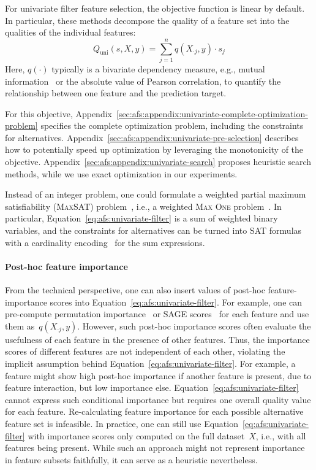 \documentclass{article}
\theoremstyle{definition}
\begin{document}
For univariate filter feature selection, the objective function is linear by default.
In particular, these methods decompose the quality of a feature set into the qualities of the individual features:
%
\begin{equation}
	Q_{\text{uni}}(s,X,y) = \sum_{j=1}^{n} q(X_{\cdot{}j},y) \cdot s_j
	\label{eq:afs:univariate-filter}
\end{equation}
%
Here, $q(\cdot)$ typically is a bivariate dependency measure, e.g., mutual information~\cite{kraskov2004estimating} or the absolute value of Pearson correlation, to quantify the relationship between one feature and the prediction target.

For this objective, Appendix~\ref{sec:afs:appendix:univariate-complete-optimization-problem} specifies the complete optimization problem, including the constraints for alternatives.
Appendix~\ref{sec:afs:appendix:univariate-pre-selection} describes how to potentially speed up optimization by leveraging the monotonicity of the objective.
Appendix~\ref{sec:afs:appendix:univariate-search} proposes heuristic search methods, while we use exact optimization in our experiments.

Instead of an integer problem, one could formulate a weighted partial maximum satisfiability (\textsc{MaxSAT}) problem~\cite{bacchus2021maximum, li2021maxsat}, i.e., a weighted \textsc{Max One} problem~\cite{khanna1997complete}.
In particular, Equation~\ref{eq:afs:univariate-filter} is a sum of weighted binary variables, and the constraints for alternatives can be turned into SAT formulas with a cardinality encoding~\cite{sinz2005towards} for the sum expressions.

\paragraph{Post-hoc feature importance}

From the technical perspective, one can also insert values of post-hoc feature-importance scores into Equation~\ref{eq:afs:univariate-filter}.
For example, one can pre-compute permutation importance~\cite{breiman2001random} or SAGE scores~\cite{covert2020understanding} for each feature and use them as~$q(X_{\cdot{}j},y)$.
However, such post-hoc importance scores often evaluate the usefulness of each feature in the presence of other features.
Thus, the importance scores of different features are not independent of each other, violating the implicit assumption behind Equation~\ref{eq:afs:univariate-filter}.
For example, a feature might show high post-hoc importance if another feature is present, due to feature interaction, but low importance else.
Equation~\ref{eq:afs:univariate-filter} cannot express such conditional importance but requires one overall quality value for each feature.
Re-calculating feature importance for each possible alternative feature set is infeasible.
In practice, one can still use Equation~\ref{eq:afs:univariate-filter} with importance scores only computed on the full dataset~$X$, i.e., with all features being present.
While such an approach might not represent importance in feature subsets faithfully, it can serve as a heuristic nevertheless.
\end{document}
